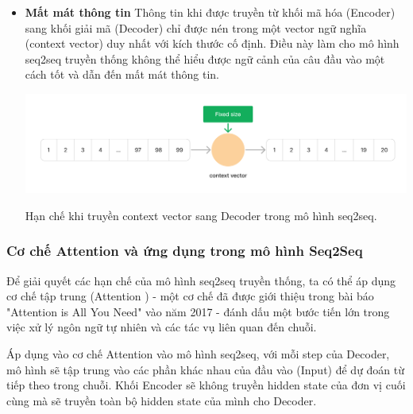 \documentclass[a4paper, 12pt, openany]{book}
\begin{document}
\begin{itemize}
    \item \textbf{Mất mát thông tin} Thông tin khi được truyền từ khối mã hóa (Encoder) sang khối giải mã (Decoder)
    chỉ được nén trong một vector ngữ nghĩa (context vector) duy nhất với kích thước cố định.
    Điều này làm cho mô hình \ac{seq2seq} truyền thống không thể hiểu được ngữ cảnh của câu đầu vào một cách tốt và dẫn đến mất mát thông tin.

    \begin{minipage}{\linewidth}
        \captionsetup{type=figure}
        \centering
        \includegraphics[width=\linewidth]{./assets/images/seq2seq_context_vector.png}
        \caption{Hạn chế khi truyền context vector sang Decoder trong mô hình \ac{seq2seq}.}
    \end{minipage}
    \vspace{0.5cm}

\end{itemize}

\subsubsection{Cơ chế Attention và ứng dụng trong mô hình Seq2Seq}
Để giải quyết các hạn chế của mô hình \ac{seq2seq} truyền thống, ta có thể áp dụng cơ chế tập trung (Attention \cite{vaswani2023attention}) - một cơ chế đã được giới thiệu trong 
bài báo "Attention is All You Need" vào năm 2017 - đánh dấu một bước tiến lớn trong việc xử lý ngôn ngữ tự nhiên và các tác vụ liên quan đến chuỗi.

Áp dụng vào cơ chế Attention vào mô hình \ac{seq2seq}, với mỗi step của Decoder, mô hình sẽ tập trung vào các phần khác nhau của đầu vào (Input) để dự đoán từ tiếp theo trong chuỗi.
Khối Encoder sẽ không truyền hidden state của đơn vị cuối cùng mà sẽ truyền toàn bộ hidden state của mình cho Decoder. 
\end{document}
